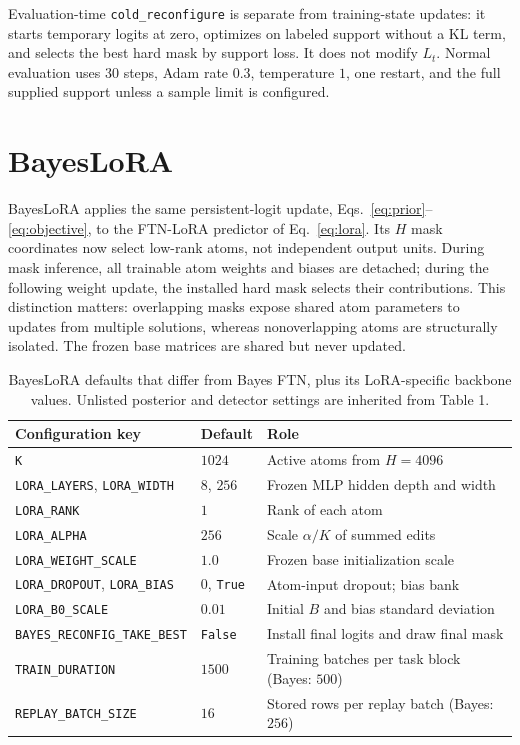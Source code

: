 \documentclass[11pt]{article}
\begin{document}
Evaluation-time \texttt{cold\_reconfigure} is separate from training-state
updates: it starts temporary logits at zero, optimizes on labeled support
without a KL term, and selects the best hard mask by support loss. It does
not modify $L_t$. Normal evaluation uses 30 steps, Adam rate $0.3$,
temperature $1$, one restart, and the full supplied support unless a sample
limit is configured.

\section{BayesLoRA}
BayesLoRA applies the same persistent-logit update,
Eqs.~\eqref{eq:prior}--\eqref{eq:objective}, to the FTN-LoRA predictor of
Eq.~\eqref{eq:lora}. Its $H$ mask coordinates now select low-rank atoms,
not independent output units. During mask inference, all trainable atom
weights and biases are detached; during the following weight update, the
installed hard mask selects their contributions. This distinction matters:
overlapping masks expose shared atom parameters to updates from multiple
solutions, whereas nonoverlapping atoms are structurally isolated. The
frozen base matrices are shared but never updated.

\begin{table}[H]
\centering\small
\caption{BayesLoRA defaults that differ from Bayes FTN, plus its LoRA-specific
backbone values. Unlisted posterior and detector settings are inherited from
Table 1.}
\begin{tabular}{@{}p{.40\linewidth}p{.17\linewidth}p{.34\linewidth}@{}}
\toprule
Configuration key & Default & Role \\
\midrule
\texttt{K} & $1024$ & Active atoms from $H=4096$ \\
\texttt{LORA\_LAYERS}, \texttt{LORA\_WIDTH} & $8$, $256$ & Frozen MLP hidden depth and width \\
\texttt{LORA\_RANK} & $1$ & Rank of each atom \\
\texttt{LORA\_ALPHA} & $256$ & Scale $\alpha/K$ of summed edits \\
\texttt{LORA\_WEIGHT\_SCALE} & $1.0$ & Frozen base initialization scale \\
\texttt{LORA\_DROPOUT}, \texttt{LORA\_BIAS} & $0$, \texttt{True} & Atom-input dropout; bias bank \\
\texttt{LORA\_B0\_SCALE} & $0.01$ & Initial $B$ and bias standard deviation \\
\texttt{BAYES\_RECONFIG\_TAKE\_BEST} & \texttt{False} & Install final logits and draw final mask \\
\texttt{TRAIN\_DURATION} & $1500$ & Training batches per task block (Bayes: $500$) \\
\texttt{REPLAY\_BATCH\_SIZE} & $16$ & Stored rows per replay batch (Bayes: $256$) \\
\bottomrule
\end{tabular}
\end{table}
\end{document}
